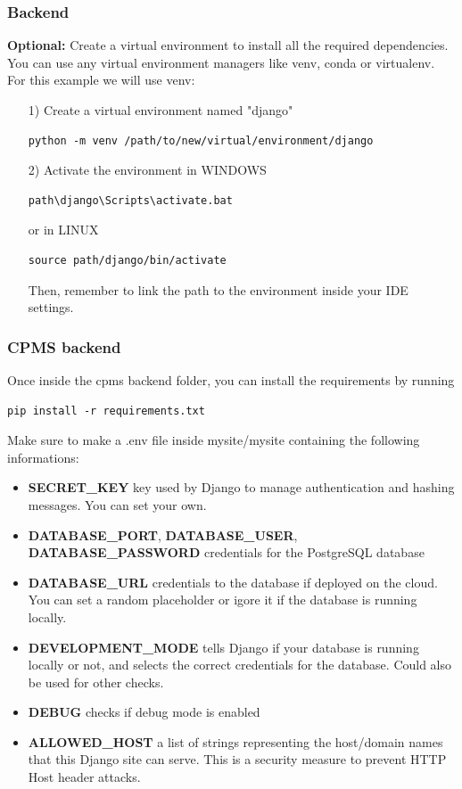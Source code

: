 \documentclass[table, 12pt]{article}
\begin{document}
\subsubsection{Backend}
\textbf{Optional:} Create a virtual environment to install all the required dependencies.
You can use any virtual environment managers like venv, conda or virtualenv.
For this example we will use venv:
\begin{itemize}
    \item[1)] Create a virtual environment named "django"
    \begin{lstlisting}[language=shell]
        python -m venv /path/to/new/virtual/environment/django
    \end{lstlisting}
    
    \item[2)] Activate the environment in WINDOWS
    \begin{lstlisting}[language=shell]
        path\django\Scripts\activate.bat
    \end{lstlisting}
    or in LINUX
    \begin{lstlisting}[language=shell]
        source path/django/bin/activate
    \end{lstlisting}

Then, remember to link the path to the environment inside your IDE settings.
\end{itemize}

\subsubsection{CPMS backend}
Once inside the cpms backend folder, you can install the requirements by running
\begin{lstlisting}[language=shell]
    pip install -r requirements.txt
\end{lstlisting}
Make sure to make a .env file inside mysite/mysite containing the following informations:
\begin{itemize}
    \item  \textbf{SECRET\_KEY} key used by Django to manage authentication and hashing messages. You can set your own.
    \item   \textbf{DATABASE\_PORT}, \textbf{DATABASE\_USER}, \textbf{DATABASE\_PASSWORD} credentials for the PostgreSQL database
    \item   \textbf{DATABASE\_URL} credentials to the database if deployed on the cloud. You can set a random placeholder or igore it if the database is running locally.
    \item   \textbf{DEVELOPMENT\_MODE} tells Django if your database is running locally or not, and selects the correct credentials for the database. Could also be used for other checks.
    \item   \textbf{DEBUG} checks if debug mode is enabled
    \item   \textbf{ALLOWED\_HOST} a list of strings representing the host/domain names that this Django site can serve. This is a security measure to prevent HTTP Host header attacks.\
\end{itemize}
\end{document}
